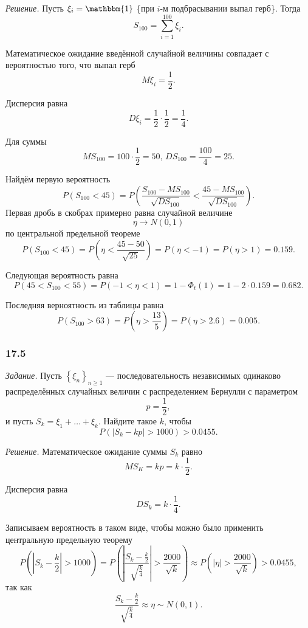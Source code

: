 \textit{Решение.} Пусть $ \xi_i = \mathbbm{1}$ \{при $i$-м подбрасывании выпал герб\}.
Тогда
$$S_{100} =
  \sum \limits_{i = 1}^{100} \xi_i.$$

Математическое ожидание введённой случайной величины совпадает с вероятностью того, что выпал герб
$$M \xi_i =
 \frac{1}{2}.$$

Дисперсия равна
$$D \xi_i =
  \frac{1}{2} \cdot \frac{1}{2} =
  \frac{1}{4}.$$

Для суммы
$$MS_{100} = 100 \cdot \frac{1}{2} = 50, \,
  DS_{100} = \frac{100}{4} = 25.$$

Найдём первую вероятность
$$P \left( S_{100} < 45 \right) =
  P \left(
      \frac{S_{100} - MS_{100}}{ \sqrt{DS_{100}}} < \frac{45 - MS_{100}}{ \sqrt{DS_{100}}}
    \right).$$
Первая дробь в скобрах примерно равна случайной величине
$$ \eta \to
  N \left( 0, 1 \right)$$
по центральной предельной теореме
$$P \left( S_{100} < 45 \right) =
  P \left( \eta < \frac{45 - 50}{ \sqrt{25}} \right) =
  P \left( \eta < -1 \right) =
  P \left( \eta > 1 \right) =
  0.159.$$

Следующая вероятность равна
$$P \left( 45 < S_{100} < 55 \right) =
  P \left( -1 < \eta < 1 \right) =
  1 - \Phi_t \left( 1 \right) =
  1 - 2 \cdot 0.159 =
  0.682.$$

Последняя верноятность из таблицы равна
$$P \left( S_{100} > 63 \right) =
  P \left( \eta > \frac{13}{5} \right) =
  P \left( \eta > 2.6 \right) =
  0.005.$$

\subsubsection*{17.5}

\textit{Задание.}
Пусть $ \left\{ \xi_n \right\}_{n \geq 1}$ ---
последовательность независимых одинаково распределённых
случайных величин с распределением Бернулли с параметром
$$p =
  \frac{1}{2},$$
и пусть $S_k = \xi_1 + \dotsc + \xi_k$.
Найдите такое $k$, чтобы
$$P \left( \left| S_k - kp \right| > 1000 \right) >
  0.0455.$$

\textit{Решение.} Математическое ожидание суммы $S_k$ равно
$$MS_K =
  kp =
  k \cdot \frac{1}{2}.$$

Дисперсия равна
$$DS_k =
  k \cdot \frac{1}{4}.$$

Записываем вероятность в таком виде, чтобы можно было применить центральную предельную теорему
$$P \left( \left| S_k - \frac{k}{2} \right| > 1000 \right) =
  P \left(
      \left| \frac{S_k - \frac{k}{2}}{ \sqrt{ \frac{k}{4}}} \right| > \frac{2000}{ \sqrt{k}}
    \right) \approx
  P \left( \left| \eta \right| > \frac{2000}{ \sqrt{k}} \right) >
  0.0455,$$
так как
$$ \frac{S_k - \frac{k}{2}}{ \sqrt{ \frac{k}{4}}} \approx
  \eta \sim
  N \left( 0, 1 \right).$$

